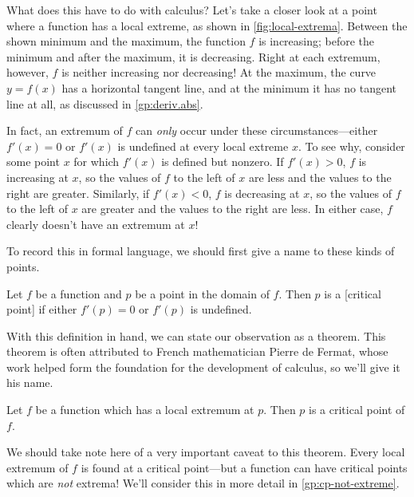 \documentclass[../book/calcnotes.tex]{subfiles}
\begin{document}
What does this have to do with calculus?
Let's take a closer look at a point where a function has a local extreme, as shown in \cref{fig:local-extrema}.
Between the shown minimum and the maximum, the function $f$ is increasing; before the minimum and after the maximum, it is decreasing.
Right at each extremum, however, $f$ is neither increasing nor decreasing!
At the maximum, the curve $y = f(x)$ has a horizontal tangent line, and at the minimum it has no tangent line at all, as discussed in \cref{gp:deriv.abs}.

In fact, an extremum of $f$ can \emph{only} occur under these circumstances---either $f'(x) = 0$ or $f'(x)$ is undefined at every local extreme $x$.
To see why, consider some point $x$ for which $f'(x)$ is defined but nonzero.
If $f'(x) > 0$, $f$ is increasing at $x$, so the values of $f$ to the left of $x$ are less and the values to the right are greater.
Similarly, if $f'(x) < 0$, $f$ is decreasing at $x$, so the values of $f$ to the left of $x$ are greater and the values to the right are less.
In either case, $f$ clearly doesn't have an extremum at $x$!

To record this in formal language, we should first give a name to these kinds of points.

\begin{definition}
  \label{def:critical-points}
  Let $f$ be a function and $p$ be a point in the domain of $f$.
  Then $p$ is a [critical point] if either $f'(p) = 0$ or $f'(p)$ is undefined.
\end{definition}

With this definition in hand, we can state our observation as a theorem.
This theorem is often attributed to French mathematician Pierre de Fermat, whose work helped form the foundation for the development of calculus, so we'll give it his name.

\begin{theorem}
  \label{thm:critical-points}
  Let $f$ be a function which has a local extremum at $p$.
  Then $p$ is a critical point of $f$.
\end{theorem}

We should take note here of a very important caveat to this theorem.
Every local extremum of $f$ is found at a critical point---but a function can have critical points which are \emph{not} extrema!
We'll consider this in more detail in \cref{gp:cp-not-extreme}.
\end{document}

